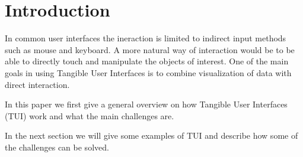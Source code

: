 \section{Introduction}


\copyrightspace

In common user interfaces the ineraction is limited to indirect input methods such as mouse and keyboard. A more natural way of interaction would be to be able to directly touch and manipulate the objects of interest. One of the main goals in using Tangible User Interfaces is to combine visualization of data with direct interaction. 

In this paper we first give a general overview on how Tangible User Interfaces (TUI) work and what the main challenges are. 

In the next section we will give some examples of TUI and describe how some of the challenges can be solved. 